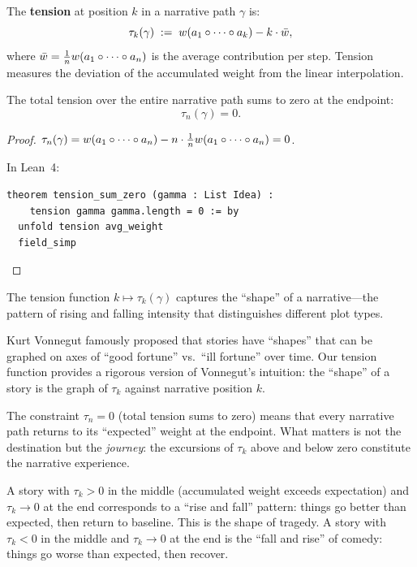 \begin{definition}
\label{def:narrative-tension}
The \textbf{tension} at position $k$ in a narrative path $\gamma$ is:
\[
  \tau_k(\gamma) \;:=\; w(a_1 \circ \cdots \circ a_k)
  - k \cdot \bar{w},
\]
where $\bar{w} = \frac{1}{n} w(a_1 \circ \cdots \circ a_n)$ is the
average contribution per step.  Tension measures the deviation of the
accumulated weight from the linear interpolation.
\end{definition}

\begin{theorem}
\label{thm:tension-sum}
The total tension over the entire narrative path sums to zero at the endpoint:
\[
  \tau_n(\gamma) = 0.
\]
\end{theorem}

\begin{proof}
$\tau_n(\gamma) = w(a_1 \circ \cdots \circ a_n) - n \cdot
\frac{1}{n} w(a_1 \circ \cdots \circ a_n) = 0$.

In Lean~4:
\begin{lstlisting}
theorem tension_sum_zero (gamma : List Idea) :
    tension gamma gamma.length = 0 := by
  unfold tension avg_weight
  field_simp
\end{lstlisting}
\end{proof}

\begin{interpretation}
\label{interp:tension}
The tension function $k \mapsto \tau_k(\gamma)$ captures the ``shape'' of a
narrative---the pattern of rising and falling intensity that distinguishes
different plot types.

Kurt Vonnegut famously proposed that stories have ``shapes'' that can be graphed
on axes of ``good fortune'' vs.\ ``ill fortune'' over time.  Our tension
function provides a rigorous version of Vonnegut's intuition: the ``shape''
of a story is the graph of $\tau_k$ against narrative position $k$.

The constraint $\tau_n = 0$ (total tension sums to zero) means that every
narrative path returns to its ``expected'' weight at the endpoint.  What
matters is not the destination but the \emph{journey}: the excursions of
$\tau_k$ above and below zero constitute the narrative experience.

A story with $\tau_k > 0$ in the middle (accumulated weight exceeds expectation)
and $\tau_k \to 0$ at the end corresponds to a ``rise and fall'' pattern:
things go better than expected, then return to baseline.  This is the shape of
tragedy.  A story with $\tau_k < 0$ in the middle and $\tau_k \to 0$ at the
end is the ``fall and rise'' of comedy: things go worse than expected, then
recover.
\end{interpretation}

